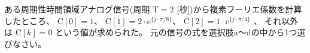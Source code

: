 ある周期性時間領域アナログ信号(周期 $\textrm{T} = 2$ [秒])から複素フーリエ係数を計算したところ、
$\textrm{C}[0] = 1$、
$\textrm{C}[1] = 2 \cdot \textrm{e}^{\{ j \cdot \pi/8 \}}$、
$\textrm{C}[2] = 1 \cdot \textrm{e}^{\{ j \cdot \pi/4 \}}$ 、
それ以外は $\textrm{C}[k] = 0$ という値が求められた。
元の信号の式を選択肢a〜dの中から1つ選びなさい。
